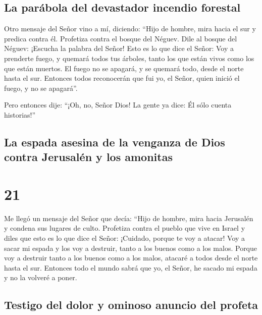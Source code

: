 \hypertarget{la-paruxe1bola-del-devastador-incendio-forestal}{%
\subsection{La parábola del devastador incendio
forestal}\label{la-paruxe1bola-del-devastador-incendio-forestal}}

 Otro mensaje del Señor vino a mí, diciendo:
 ``Hijo de hombre, mira hacia el sur y predica contra él.
Profetiza contra el bosque del Néguev.  Dile al bosque
del Néguev: ¡Escucha la palabra del Señor! Esto es lo que dice el Señor:
Voy a prenderte fuego, y quemará todos tus árboles, tanto los que están
vivos como los que están muertos. El fuego no se apagará, y se quemará
todo, desde el norte hasta el sur.  Entonces todos
reconocerán que fui yo, el Señor, quien inició el fuego, y no se
apagará''.

 Pero entonces dije: ``¡Oh, no, Señor Dios! La gente ya
dice: Él sólo cuenta historias!''

\hypertarget{la-espada-asesina-de-la-venganza-de-dios-contra-jerusaluxe9n-y-los-amonitas}{%
\subsection{La espada asesina de la venganza de Dios contra Jerusalén y
los
amonitas}\label{la-espada-asesina-de-la-venganza-de-dios-contra-jerusaluxe9n-y-los-amonitas}}

\hypertarget{section-20}{%
\section{21}\label{section-20}}

 Me llegó un mensaje del Señor que decía: 
``Hijo de hombre, mira hacia Jerusalén y condena sus lugares de culto.
Profetiza contra el pueblo que vive en Israel  y diles que
esto es lo que dice el Señor: ¡Cuidado, porque te voy a atacar! Voy a
sacar mi espada y los voy a destruir, tanto a los buenos como a los
malos.  Porque voy a destruir tanto a los buenos como a
los malos, atacaré a todos desde el norte hasta el sur. 
Entonces todo el mundo sabrá que yo, el Señor, he sacado mi espada y no
la volveré a poner.

\hypertarget{testigo-del-dolor-y-ominoso-anuncio-del-profeta}{%
\subsection{Testigo del dolor y ominoso anuncio del
profeta}\label{testigo-del-dolor-y-ominoso-anuncio-del-profeta}}


